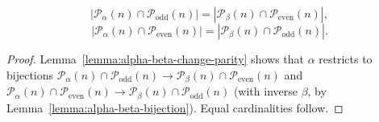 \begin{lemma}\label{lemma:alpha-odd-eq-beta-even}\leanok
$$\left| \mathcal{P}_\alpha(n)\cap \mathcal{P}_{\mathrm{odd}}(n)\right|=\left| \mathcal{P}_\beta(n)\cap \mathcal{P}_{\mathrm{even}}(n)\right|,$$
$$\left| \mathcal{P}_\alpha(n)\cap \mathcal{P}_{\mathrm{even}}(n)\right|=\left| \mathcal{P}_\beta(n)\cap \mathcal{P}_{\mathrm{odd}}(n)\right|.$$
\end{lemma}
\begin{proof}\leanok
Lemma~\ref{lemma:alpha-beta-change-parity} shows that $\alpha$ restricts to bijections
$\mathcal{P}_\alpha(n) \cap \mathcal{P}_{\mathrm{odd}}(n) \to \mathcal{P}_\beta(n) \cap \mathcal{P}_{\mathrm{even}}(n)$
and
$\mathcal{P}_\alpha(n) \cap \mathcal{P}_{\mathrm{even}}(n) \to \mathcal{P}_\beta(n) \cap \mathcal{P}_{\mathrm{odd}}(n)$
(with inverse $\beta$, by Lemma~\ref{lemma:alpha-beta-bijection}). Equal cardinalities follow.
\end{proof}

